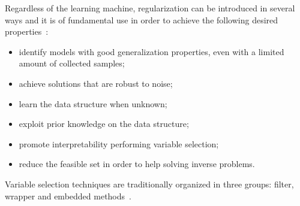     Regardless of the learning machine, regularization can be introduced in several ways and it is of fundamental use in order to achieve the following desired properties~\citep{okser2014regularized}:
    \begin{itemize}
    	\item identify models with good generalization properties, even with a limited amount of collected samples;
    	\item achieve solutions that are robust to noise;
    	\item learn the data structure when unknown;
    	\item exploit prior knowledge on the data structure;
        \item promote interpretability performing variable selection;
    	\item reduce the feasible set in order to help solving inverse problems.
   \end{itemize}

	Variable selection techniques are traditionally organized in three groups: filter, wrapper and embedded methods~\cite{guyon2003introduction}.

